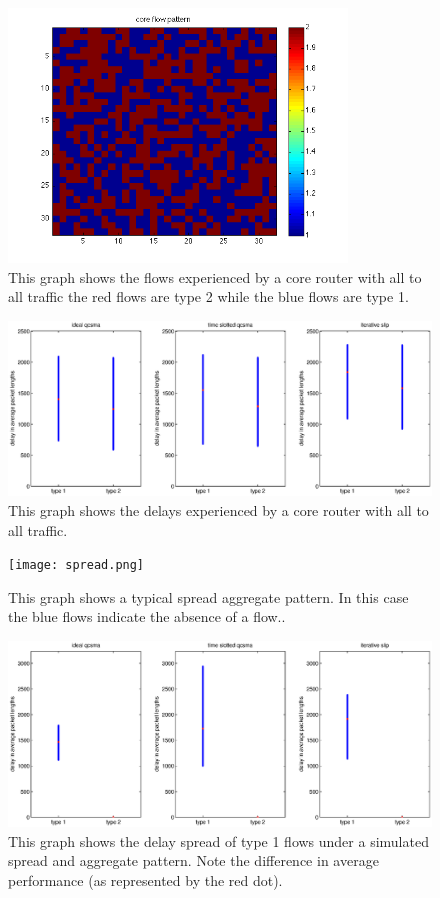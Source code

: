 \documentclass[11pt]{article}%
\begin{document}
\begin{figure}%
	 \includegraphics[width=90mm]{all2allflows.png}
	\caption{This graph shows the flows experienced by a core router with all to all traffic the red flows are type 2 while the blue flows are type 1.}
	\label{all_to_all_flows}
\end{figure}

\begin{figure}%
	 \includegraphics[width=\textwidth]{all_2_all.eps}
	\caption{This graph shows the delays experienced by a core router with all to all traffic.}
	\label{all_to_all}
\end{figure}


\begin{figure}%
	 \texttt{[image: spread.png]}
	\caption{This graph shows a typical spread aggregate pattern.  In this case the blue flows indicate the absence of a flow..}
	\label{spreadagg}
\end{figure}


\begin{figure}%
	 \includegraphics[width=\textwidth]{vs_spread.eps}
	\caption{This graph shows the delay spread of type 1 flows under a simulated spread and aggregate pattern.  Note the difference in average performance (as represented by the red dot).}
	\label{vs_spreadagg}
\end{figure}
\end{document}
